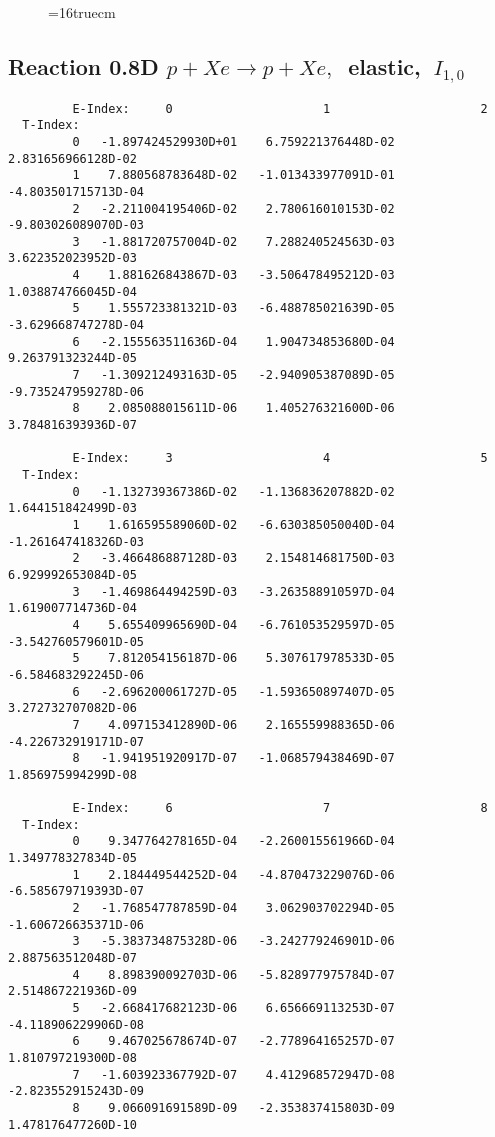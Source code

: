 \documentclass[12pt,dvipdfmx]{article}
\begin{document}
\begin{figure} \label{0.8T}
\epsfxsize=16truecm
\end{figure}

\newpage

\subsection{
Reaction 0.8D  $p + Xe \rightarrow p + Xe ,\ $
 elastic, $\  I_{1,0}$
}

\begin{small}\begin{verbatim}
         E-Index:     0                     1                     2
  T-Index:
         0   -1.897424529930D+01    6.759221376448D-02    2.831656966128D-02
         1    7.880568783648D-02   -1.013433977091D-01   -4.803501715713D-04
         2   -2.211004195406D-02    2.780616010153D-02   -9.803026089070D-03
         3   -1.881720757004D-02    7.288240524563D-03    3.622352023952D-03
         4    1.881626843867D-03   -3.506478495212D-03    1.038874766045D-04
         5    1.555723381321D-03   -6.488785021639D-05   -3.629668747278D-04
         6   -2.155563511636D-04    1.904734853680D-04    9.263791323244D-05
         7   -1.309212493163D-05   -2.940905387089D-05   -9.735247959278D-06
         8    2.085088015611D-06    1.405276321600D-06    3.784816393936D-07

         E-Index:     3                     4                     5
  T-Index:
         0   -1.132739367386D-02   -1.136836207882D-02    1.644151842499D-03
         1    1.616595589060D-02   -6.630385050040D-04   -1.261647418326D-03
         2   -3.466486887128D-03    2.154814681750D-03    6.929992653084D-05
         3   -1.469864494259D-03   -3.263588910597D-04    1.619007714736D-04
         4    5.655409965690D-04   -6.761053529597D-05   -3.542760579601D-05
         5    7.812054156187D-06    5.307617978533D-05   -6.584683292245D-06
         6   -2.696200061727D-05   -1.593650897407D-05    3.272732707082D-06
         7    4.097153412890D-06    2.165559988365D-06   -4.226732919171D-07
         8   -1.941951920917D-07   -1.068579438469D-07    1.856975994299D-08

         E-Index:     6                     7                     8
  T-Index:
         0    9.347764278165D-04   -2.260015561966D-04    1.349778327834D-05
         1    2.184449544252D-04   -4.870473229076D-06   -6.585679719393D-07
         2   -1.768547787859D-04    3.062903702294D-05   -1.606726635371D-06
         3   -5.383734875328D-06   -3.242779246901D-06    2.887563512048D-07
         4    8.898390092703D-06   -5.828977975784D-07    2.514867221936D-09
         5   -2.668417682123D-06    6.656669113253D-07   -4.118906229906D-08
         6    9.467025678674D-07   -2.778964165257D-07    1.810797219300D-08
         7   -1.603923367792D-07    4.412968572947D-08   -2.823552915243D-09
         8    9.066091691589D-09   -2.353837415803D-09    1.478176477260D-10
\end{verbatim}\end{small}
\end{document}
